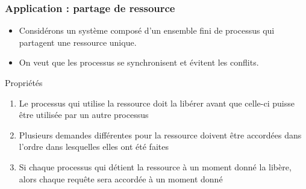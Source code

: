 \documentclass[compress]{beamer}
\begin{document}
\begin{frame}
\frametitle{Application : partage de ressource}
\begin{itemize}
\item Considérons un système composé d'un ensemble fini de processus qui partagent une ressource unique.
\item On veut que les processus se synchronisent et évitent les conflits.
\end{itemize}
\begin{block}{Propriétés}
\begin{enumerate}
\item Le processus qui utilise la ressource doit la libérer avant que celle-ci puisse être utilisée par un autre processus
\item Plusieurs demandes différentes pour la ressource doivent être accordées dans l'ordre dans lesquelles elles ont été faites
\item Si chaque processus qui détient la ressource à un moment donné la libère, alors chaque requête sera accordée à un moment donné
\end{enumerate}
\end{block}
\end{frame}
\end{document}
